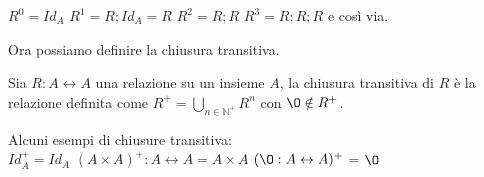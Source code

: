 \begin{example}
$R^0 = Id_A$ \hspace{.3cm} $R^1 = R;Id_A = R$ \hspace{.3cm} $R^2 = R;R$ \hspace{.3cm} $R^3 = R;R;R$ e così via.
\end{example}
Ora possiamo definire la chiusura transitiva.
\begin{definition}
    Sia $R: A \leftrightarrow A$ una relazione su un insieme $A$, la chiusura transitiva di $R$ è la relazione definita come $R^{+} = \bigcup\limits_{n \in \mathbb{N}^+} R^{n}$ con $\O \notin R^{+}$.
\end{definition}
\begin{example}
Alcuni esempi di chiusure transitiva:\\
$Id_A^+ = Id_A$ \hspace{.7cm} $(A \times A)^+:A\leftrightarrow A = A \times A$ \hspace{.7cm} $(\O: A \leftrightarrow A)^+$ = $\O$
\end{example}

